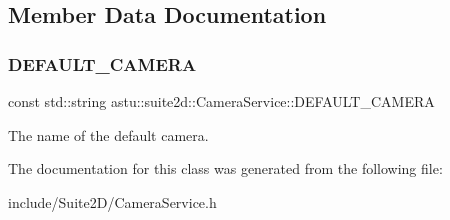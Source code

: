 \subsection{Member Data Documentation}
\mbox{\label{classastu_1_1suite2d_1_1CameraService_ae92f5163a54b2ab8dd738cadee8f75eb}} 
\subsubsection{\texorpdfstring{D\+E\+F\+A\+U\+L\+T\+\_\+\+C\+A\+M\+E\+RA}{DEFAULT\_CAMERA}}
{\footnotesize\ttfamily const std\+::string astu\+::suite2d\+::\+Camera\+Service\+::\+D\+E\+F\+A\+U\+L\+T\+\_\+\+C\+A\+M\+E\+RA\hspace{0.3cm}{\ttfamily [static]}}

The name of the default camera. 

The documentation for this class was generated from the following file\+:\begin{DoxyCompactItemize}
\item 
include/\+Suite2\+D/Camera\+Service.\+h\end{DoxyCompactItemize}
